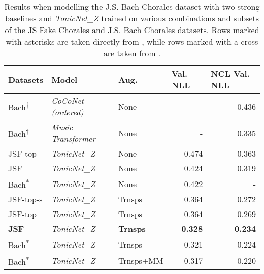 \documentclass{article}
\begin{document}
\begin{table}
\centering
\caption{Results when modelling the J.S. Bach Chorales dataset with two strong baselines and \textit{TonicNet\_Z} trained on various combinations and subsets of the JS Fake Chorales and J.S. Bach Chorales datasets. Rows marked with asterisks are taken directly from \cite{tonicnet}, while rows marked with a cross are taken from \cite{musictransformer}. \newline}
\label{tab:tonicnet}
\begin{tabular}{lllrr}
\textbf{Datasets}       & \textbf{Model}              & \textbf{Aug.}   & \multicolumn{1}{l}{\textbf{Val. NLL}} & \multicolumn{1}{l}{\textbf{NCL Val. NLL}}  \\ 
\hline\hline
Bach\textsuperscript{†} & \textit{CoCoNet (ordered) }           & None            & -                                     & 0.436                                      \\ 
\hline
Bach\textsuperscript{†} & \textit{Music Transformer } & None            & -                                     & 0.335                                      \\ 
\hline
JSF-top                 & \textit{TonicNet\_Z }       & None            & 0.474                                 & 0.363                                      \\
JSF                     & \textit{TonicNet\_Z }       & None            & 0.424                                 & 0.319                                      \\
Bach\textsuperscript{*} & \textit{TonicNet\_Z }       & None            & 0.422                                 & -                                          \\
JSF-top-s               & \textit{TonicNet\_Z }       & Trnsps          & 0.364                                 & 0.272                                      \\
JSF-top                 & \textit{TonicNet\_Z }       & Trnsps          & 0.364                                 & 0.269                                      \\
\textbf{JSF}            & \textit{TonicNet\_Z }       & \textbf{Trnsps} & \textbf{0.328}                        & \textbf{0.234}                             \\
Bach\textsuperscript{*} & \textit{TonicNet\_Z }       & Trnsps          & 0.321                                 & 0.224                                      \\
Bach\textsuperscript{*} & \textit{TonicNet\_Z }       & Trnsps+MM       & 0.317                                 & 0.220                                      \\

\end{tabular}
\end{table}
\end{document}

